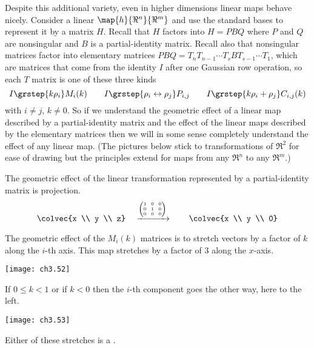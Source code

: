 Despite this additional variety, 
even in higher dimensions linear maps behave nicely.
Consider a linear $\map{h}{\Re^n}{\Re^m}$ and
use the standard bases to represent it by a matrix $H$.
Recall that $H$ factors into $H=PBQ$ 
where $P$ and $Q$ are nonsingular and $B$ is a partial-identity matrix.
Recall also that nonsingular matrices
factor into elementary 
matrices
$PBQ=T_nT_{n-1}\cdots T_sBT_{s-1}\cdots T_1$,
which are matrices that
come from the identity $I$ after one Gaussian row operation,
so each $T$ matrix is one of these three kinds
\begin{equation*}
  I\grstep{k\rho_i}M_i(k) 
  \qquad 
  I\grstep{\rho_i\leftrightarrow\rho_j}P_{i,j}  
  \qquad
  I\grstep{k\rho_i+\rho_j}C_{i,j}(k) 
\end{equation*}
with $i\neq j$, $k\neq 0$.
So if we understand the geometric effect of a linear map described
by a partial-identity matrix and the effect of the linear maps
described by the elementary matrices then we will in some sense
completely understand the effect of any linear map.
(The pictures below stick to transformations of $\Re^2$ for ease of drawing
but the principles extend for maps from any $\Re^n$ to any $\Re^m$.)

The geometric effect of the linear transformation represented by a  
partial-identity matrix is projection.
\begin{equation*}
  \colvec{x \\ y  \\ z}
  \quad\xrightarrow{{\text{\tiny$\displaystyle\left(\begin{array}[r]{@{}c@{\hspace{0.8em}}c@{\hspace{0.8em}}c@{}}
                1  &0  &0 \\
                0  &1  &0 \\
                0  &0  &0
          \end{array}\right)$}}}
  \qquad
  \colvec{x \\ y  \\ 0}
\end{equation*}

The geometric effect of the $M_i(k)$ matrices
is to  
stretch vectors by a factor of $k$ along the $i$-th axis.
This map stretches by a factor of $3$ along the $x$-axis.
\begin{center}
  \texttt{[image: ch3.52]}
\end{center}
If $0\leq k<1$ or if $k<0$ then the $i$-th
component goes the other way, here to the left.
\begin{center}
  \texttt{[image: ch3.53]}
\end{center}
Either of these stretches is a 
.

